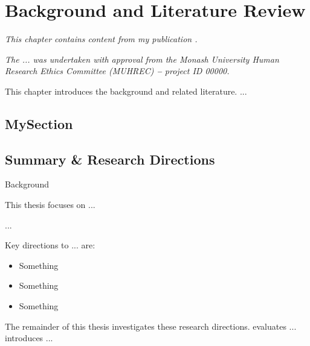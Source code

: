 \chapter{Background and Literature Review} \label{chap:BG}

\begin{displayquote} \emph{%
	This chapter contains content from my publication \cite{example1}.
} \end{displayquote}\vspace*{-2\baselineskip}\vspace*{\parskip}
\begin{displayquote} \emph{%
	The ... was undertaken with approval from the Monash University Human Research Ethics Committee (MUHREC) \textbf{--} project ID 00000.
} \end{displayquote}

This chapter introduces the background and related literature. ...


\section{MySection}



\section{Summary \& Research Directions}
Background

This thesis focuses on ...

...

Key directions to ... are:
\begin{itemize}[topsep=0pt,beginpenalty=10000,first=]
	\item Something
	\item Something
	\item Something
\end{itemize}

The remainder of this thesis investigates these research directions.  evaluates ...  introduces ...


